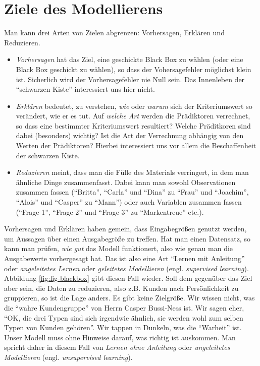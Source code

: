 \documentclass[12pt,]{book}
\begin{document}
\section{Ziele des Modellierens}\label{ziele-des-modellierens}

Man kann drei Arten von Zielen abgrenzen: Vorhersagen, Erklären und
Reduzieren.

\begin{itemize}
\item
  \emph{Vorhersagen} hat das Ziel, eine geschickte
  Black Box zu wählen (oder eine Black Box geschickt zu wählen), so dass
  der Vohersagefehler möglichst klein ist. Sicherlich wird der
  Vorhersagefehler nie Null sein. Das Innenleben der ``schwarzen Kiste''
  interessiert uns hier nicht.
\item
  \emph{Erklären} bedeutet, zu verstehen, \emph{wie}
  oder \emph{warum} sich der Kriteriumswert so verändert, wie er es tut.
  Auf \emph{welche Art} werden die Prädiktoren verrechnet, so dass eine
  bestimmter Kriteriumswert resultiert? Welche Präditkoren sind dabei
  (besonders) wichtig? Ist die Art der Verrechnung abhängig von den
  Werten der Prädiktoren? Hierbei interessiert uns vor allem die
  Beschaffenheit der schwarzen Kiste.
\item
  \emph{Reduzieren} meint, dass man die Fülle des
  Materials verringert, in dem man ähnliche Dinge zusammenfasst. Dabei
  kann man sowohl Observationen zusammen fassen (``Britta'', ``Carla''
  und ``Dina'' zu ``Frau'' und ``Joachim'', ``Alois'' und ``Casper'' zu
  ``Mann'') oder auch Variablen zusammen fassen (``Frage 1'', ``Frage
  2'' und ``Frage 3'' zu ``Markentreue'' etc.).
\end{itemize}

Vorhersagen und Erklären haben gemein, dass Eingabegrößen genutzt
werden, um Aussagen über einen Ausgabegröße zu treffen. Hat man einen
Datensatz, so kann man prüfen, \emph{wie gut} das Modell funktionert,
also wie genau man die Ausgabewerte vorhergesagt hat. Das ist also eine
Art ``Lernen mit Anleitung'' oder \emph{angeleitetes Lernen} oder
\emph{geleitetes Modellieren} (engl. \emph{supervised learning}).
Abbildung \ref{fig:fig-blackbox} gibt diesen Fall wieder. Soll dem
gegenüber das Ziel aber sein, die Daten zu reduzieren, also z.B. Kunden
nach Persönlichkeit zu gruppieren, so ist die Lage anders. Es gibt keine
Zielgröße. Wir wissen nicht, was die ``wahre Kundengruppe'' von Herrn
Casper Bussi-Ness ist. Wir sagen eher, ``OK, die drei Typen sind sich
irgendwie ähnlich, sie werden wohl zum selben Typen von Kunden
gehören''. Wir tappen in Dunkeln, was die ``Warheit'' ist. Unser Modell
muss ohne Hinweise darauf, was richtig ist auskommen. Man spricht daher
in diesem Fall von \emph{Lernen ohne
Anleitung} oder \emph{ungeleitetes
Modellieren} (engl. \emph{unsupervised
learning}).
\end{document}
